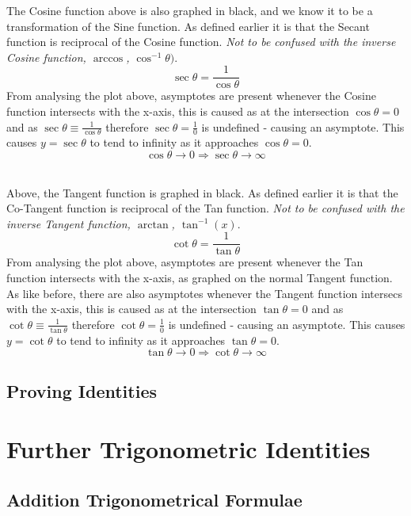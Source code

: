 \documentclass{article}
\begin{document}
	The Cosine function above is also graphed in black, and we know it to be a transformation of the Sine function. As defined earlier it is that the Secant function is reciprocal of the Cosine function. \textit{Not to be confused with the inverse Cosine function, $\arccos$, $\cos^{-1}\theta)$}. $$\sec\theta = \frac{1}{\cos\theta}$$  From analysing the plot above, asymptotes are present whenever the Cosine function intersects with the x-axis, this is caused as at the intersection $\cos\theta=0$ and as $\sec\theta\equiv\frac{1}{\cos\theta}$ therefore $\sec\theta=\frac{1}{0}$ is undefined - causing an asymptote. This causes $y=\sec\theta$ to tend to infinity as it approaches $\cos\theta=0$. $$\cos\theta \to 0 \Rightarrow \sec\theta\to\infty$$
	\\
	\begin{center}
	\end{center}
	Above, the Tangent function is graphed in black. As defined earlier it is that the Co-Tangent function is reciprocal of the Tan function. \textit{Not to be confused with the inverse Tangent function, $\arctan$, $\tan^{-1}(x)$}. $$\cot\theta = \frac{1}{\tan\theta}$$ From analysing the plot above, asymptotes are present whenever the Tan function intersects with the x-axis, as graphed on the normal Tangent function. As like before, there are also asymptotes whenever the Tangent function intersecs with the x-axis, this is caused as at the intersection $\tan\theta=0$ and as $\cot\theta\equiv\frac{1}{\tan\theta}$ therefore $\cot\theta=\frac{1}{0}$ is undefined - causing an asymptote. This causes $y=\cot\theta$ to tend to infinity as it approaches $\tan\theta=0$. $$\tan\theta \to 0 \Rightarrow \cot\theta\to\infty$$
	
	
	\subsection{Proving Identities}
	\section{Further Trigonometric Identities }
	\subsection{Addition Trigonometrical Formulae}
\end{document}
